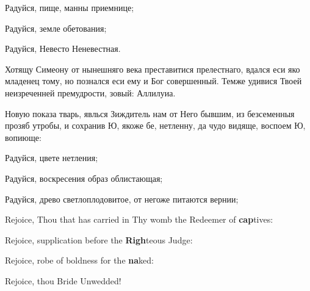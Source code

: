 
Радуйся, пище, манны приемнице;


Радуйся, земле обетования;


Радуйся, Невесто Неневестная.


\Ierei Хотящу Симеону от нынешняго века преставитися прелестнаго, вдался еси яко младенец тому, но познался еси ему и Бог совершенный. Темже удивися Твоей неизреченней премудрости, зовый: Аллилуиа.


\Ierei Новую показа тварь, явлься Зиждитель нам от Него бывшим, из безсеменныя прозяб утробы, и сохранив Ю, якоже бе, нетленну, да чудо видяще, воспоем Ю, вопиюще:

Радуйся, цвете нетления;


Радуйся, воскресения образ облистающая;


Радуйся, древо светлоплодовитое, от негоже питаются вернии;


\pagebreak



Rejoice, Thou that has carried in Thy womb the Redeemer of \textbf{cap}tives:


Rejoice, supplication before the \textbf{Righ}teous Judge:


Rejoice, robe of boldness for the \textbf{na}ked:


Rejoice, thou Bride Unwedded!



